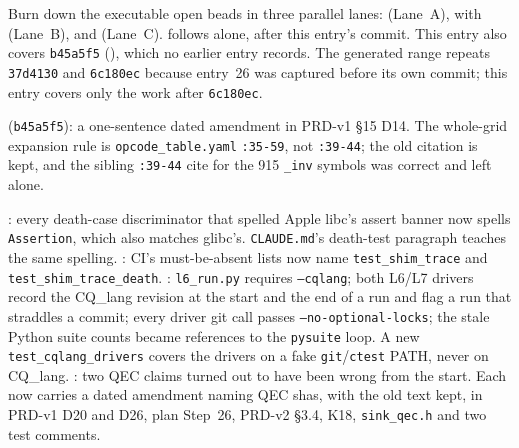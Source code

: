 \begin{generated}
\end{generated}


Burn down the executable open beads in three parallel lanes: 
(Lane~A),  with  (Lane~B), and  (Lane~C).
 follows alone, after this entry's commit. This entry also
covers \texttt{b45a5f5} (), which no earlier entry records. The
generated range repeats \texttt{37d4130} and \texttt{6c180ec} because entry~26
was captured before its own commit; this entry covers only the work after
\texttt{6c180ec}.

 (\texttt{b45a5f5}): a one-sentence dated amendment in PRD-v1
§15 D14. The whole-grid expansion rule is \texttt{opcode\_table.yaml}
\texttt{:35-59}, not \texttt{:39-44}; the old citation is kept, and the
sibling \texttt{:39-44} cite for the 915 \texttt{\_inv} symbols was correct
and left alone.

: every death-case discriminator that spelled Apple libc's
assert banner now spells \texttt{Assertion}, which also matches glibc's.
\texttt{CLAUDE.md}'s death-test paragraph teaches the same spelling.
: CI's must-be-absent lists now name \texttt{test\_shim\_trace}
and \texttt{test\_shim\_trace\_death}. : \texttt{l6\_run.py}
requires \texttt{--cqlang}; both L6/L7 drivers record the CQ\_lang revision
at the start and the end of a run and flag a run that straddles a commit;
every driver git call passes \texttt{--no-optional-locks}; the stale Python
suite counts became references to the \texttt{pysuite} loop. A new
\texttt{test\_cqlang\_drivers} covers the drivers on a fake
\texttt{git}/\texttt{ctest} PATH, never on CQ\_lang. : two QEC
claims turned out to have been wrong from the start. Each now carries a
dated amendment naming QEC shas, with the old text kept, in PRD-v1 D20 and
D26, plan Step~26, PRD-v2 §3.4, K18, \texttt{sink\_qec.h} and two test
comments.

